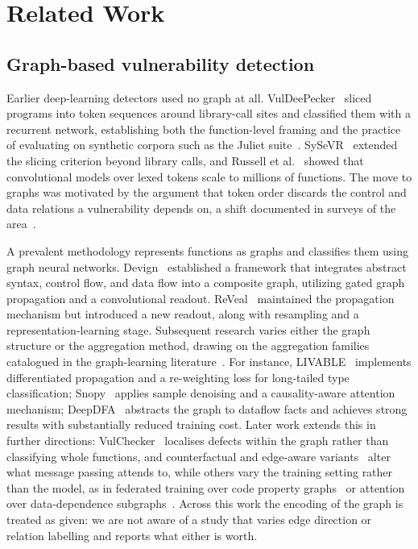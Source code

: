 \section{Related Work}
\label{sec:related}

\subsection{Graph-based vulnerability detection}
Earlier deep-learning detectors used no graph at all.
VulDeePecker~\citep{Li_2018} sliced programs into token sequences around
library-call sites and classified them with a recurrent network, establishing
both the function-level framing and the practice of evaluating on synthetic
corpora such as the Juliet suite~\citep{juliet2017,6329885}. SySeVR~\citep{9321538}
extended the slicing criterion beyond library calls, and Russell et
al.~\citep{russell2018automatedvulnerabilitydetectionsource} showed that
convolutional models over lexed tokens scale to millions of functions. The move to graphs was
motivated by the argument that token order discards the control and data
relations a vulnerability depends on, a shift documented in surveys of the
area~\citep{harzevili2023surveyautomatedsoftwarevulnerability,shimmi2025aibasedsoftwarevulnerabilitydetection,uddin2025deeplearningaidedsoftware,Guo2024}.

A prevalent methodology represents functions as graphs and classifies them using graph neural networks. Devign~\citep{zhou2019devigneffectivevulnerabilityidentification} established a framework that integrates abstract syntax, control flow, and data flow into a composite graph, utilizing gated graph propagation and a convolutional readout. ReVeal~\citep{chakraborty2020deeplearningbasedvulnerability} maintained the propagation mechanism but introduced a new readout, along with resampling and a representation-learning stage. Subsequent research varies either the graph structure or the aggregation method, drawing on the aggregation families catalogued in the graph-learning literature~\citep{zhou2021graphneuralnetworksreview}. For instance, LIVABLE~\citep{wen2023livable} implements differentiated propagation and a re-weighting loss for long-tailed type classification; Snopy~\citep{cao2024snopy} applies sample denoising and a causality-aware attention mechanism; DeepDFA~\citep{steenhoek2023dataflowanalysisinspireddeeplearning} abstracts the graph to dataflow facts and achieves strong results with substantially reduced training cost. Later work extends this in further directions: VulChecker~\citep{10.5555/3620237.3620604} localises defects within the graph rather than classifying whole functions, and counterfactual and edge-aware variants~\citep{10.1145/3650212.3652136,haque2025explainablevulnerabilitydetectioncc} alter what message passing attends to, while others vary the training setting rather than the model, as in federated training over code property graphs~\citep{ZHANG2024107371} or attention over data-dependence subgraphs~\citep{zhou2022grapheyenovelsolutiondetecting}. Across this work the encoding of the graph is treated as given: we are not aware of a study that varies edge direction or relation labelling and reports what either is worth.

